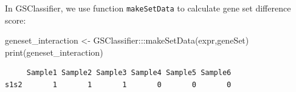 \documentclass[
]{book}
\newenvironment{Shaded}{\begin{snugshade}}{\end{snugshade}}
\newcommand{\FunctionTok}[1]{\textcolor[rgb]{0.00,0.00,0.00}{#1}}
\newcommand{\NormalTok}[1]{#1}
\newcommand{\OtherTok}[1]{\textcolor[rgb]{0.56,0.35,0.01}{#1}}
\newcommand{\SpecialCharTok}[1]{\textcolor[rgb]{0.00,0.00,0.00}{#1}}
\begin{document}
In GSClassifier, we use function \texttt{makeSetData} to calculate gene set difference score:

\begin{Shaded}
\begin{Highlighting}[]
\NormalTok{geneset\_interaction }\OtherTok{\textless{}{-}}\NormalTok{ GSClassifier}\SpecialCharTok{:::}\FunctionTok{makeSetData}\NormalTok{(expr,geneSet)}
\FunctionTok{print}\NormalTok{(geneset\_interaction)}
\end{Highlighting}
\end{Shaded}

\begin{verbatim}
     Sample1 Sample2 Sample3 Sample4 Sample5 Sample6
s1s2       1       1       1       0       0       0
\end{verbatim}

  
\end{document}
